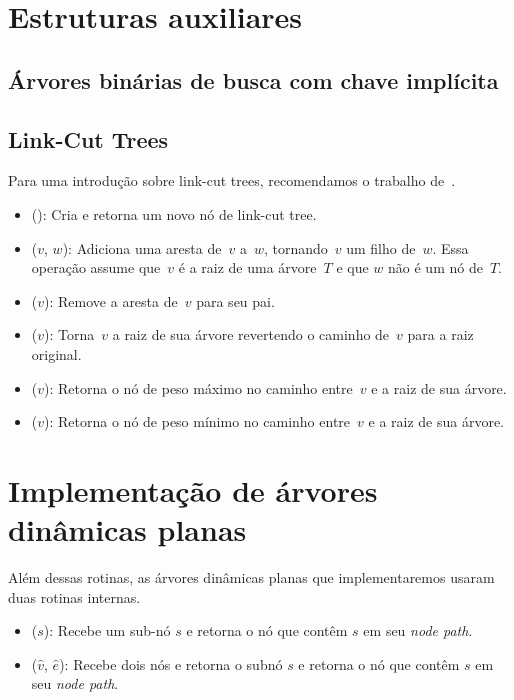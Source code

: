 \section{Estruturas auxiliares}
\subsection{Árvores binárias de busca com chave implícita}
\subsection{Link-Cut Trees}
\label{sec:linkcuttree}

Para uma introdução sobre link-cut trees, recomendamos o trabalho de~\cite{linkcuttree}.

\begin{itemize}
\item \linkcutCreate(): Cria e retorna um novo nó de link-cut tree.
\item \linkcutAddEdge($v$, $w$): Adiciona uma aresta de~$v$ a~$w$, tornando~$v$ um filho de~$w$. Essa operação assume que~$v$ é a raiz de uma árvore~$T$ e que $w$ não é um nó de~$T$.
\item \linkcutDelEdge($v$): Remove a aresta de~$v$ para seu pai.
\item \linkcutEvert($v$): Torna~$v$ a raiz de sua árvore revertendo o caminho de~$v$ para a raiz original.
\item \linkcutMax($v$): Retorna o nó de peso máximo no caminho entre~$v$ e a raiz de sua árvore.
\item \linkcutMin($v$): Retorna o nó de peso mínimo no caminho entre~$v$ e a raiz de sua árvore.
\end{itemize}


\section{Implementação de árvores dinâmicas planas}

Além dessas rotinas, as árvores dinâmicas planas que implementaremos usaram duas rotinas internas.

\begin{itemize}
\item \LCOFindNode($s$): Recebe um sub-nó $s$ e retorna o nó que contêm $s$ em seu \textit{node path}.
\item \LCOFindSubNode($\hat v$, $\hat e$): Recebe dois nós e retorna o subnó $s$ e retorna o nó que contêm $s$ em seu \textit{node path}.
\end{itemize}






